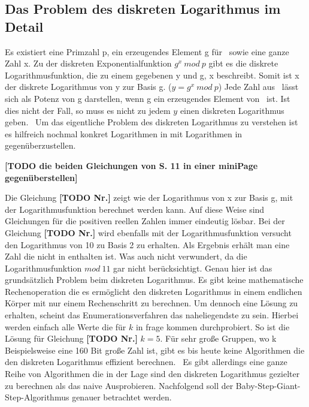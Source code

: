 	\subsection{Das Problem des diskreten Logarithmus im Detail}
		Es existiert eine Primzahl p, ein erzeugendes Element g für \myZPStern~sowie eine ganze Zahl x. Zu der diskreten Exponentialfunktion $g^x~mod~p$ gibt es die diskrete Logarithmusfunktion, die zu einem gegebenen y und g, x beschreibt. Somit ist x der diskrete Logarithmus von y zur Basis g. ($y = g^x~mod~p$) Jede Zahl aus \myZPStern~lässt sich als Potenz von g darstellen, wenn g ein erzeugendes Element von \myZPStern~ist. Ist dies nicht der Fall, so muss es nicht zu jedem $y$ \myin \myZPStern einen diskreten Logarithmus geben.~\cite{Kryptografie:in:Theorie:und:Praxis} Um das eigentliche Problem des diskreten Logarithmus zu verstehen ist es hilfreich nochmal konkret Logarithmen in  mit Logarithmen in \myZPStern gegenüberzustellen. 
		
		\textbf{[TODO die beiden Gleichungen von\cite{DLP:ECDLP:Probleme:und:Loesungen} S. 11 in einer miniPage gegenüberstellen]}
		
		Die Gleichung \textbf{[TODO Nr.]} zeigt wie der Logarithmus von x zur Basis g, mit der Logarithmusfunktion berechnet werden kann. Auf diese Weise sind Gleichungen für die positiven reellen Zahlen  immer eindeutig lösbar. Bei der Gleichung \textbf{[TODO Nr.]} wird ebenfalls mit der Logarithmusfunktion versucht den Logarithmus von 10 zu Basis 2 zu erhalten. Als Ergebnis erhält man eine Zahl die nicht in enthalten ist. Was auch nicht verwundert, da die Logarithmusfunktion $mod~11$ gar nicht berücksichtigt. Genau hier ist das grundsätzlich Problem beim diskreten Logarithmus. Es gibt keine mathematische Rechenoperation die es ermöglicht den diskreten Logarithmus in einem endlichen Körper mit nur einem Rechenschritt zu berechnen. Um dennoch eine Lösung zu erhalten, scheint das Enumerationsverfahren das naheliegendste zu sein. Hierbei werden einfach alle Werte die für $k$ in frage kommen durchprobiert. So ist die Lösung für Gleichung \textbf{[TODO Nr.]} $k = 5$. Für sehr große Gruppen, wo k Beispielsweise eine 160 Bit große Zahl ist, gibt es bis heute keine Algorithmen die den diskreten Logarithmus effizient berechnen.~\cite{DLP:ECDLP:Probleme:und:Loesungen} Es gibt allerdings eine ganze Reihe von Algorithmen die in der Lage sind den diskreten Logarithmus gezielter zu berechnen als das naive Ausprobieren. Nachfolgend soll der Baby-Step-Giant-Step-Algorithmus genauer betrachtet werden.
		
